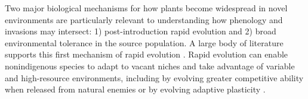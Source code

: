 \documentclass[11pt]{article}\usepackage[]{graphicx}\usepackage[]{color}
\begin{document}
Two major biological mechanisms for how plants become widespread in novel environments are particularly relevant to understanding how phenology and invasions may intersect: 1) post-introduction rapid evolution and 2) broad environmental tolerance in the source population. A large body of literature supports this first mechanism of rapid evolution \parencite[e.g.,][]{Reznick2001, Prentis2008,Colautti2015,Lee2002invasion,Clements2011}.  Rapid evolution can enable nonindigenous species to adapt to vacant niches and take advantage of variable and high-resource environments, including by evolving greater competitive ability when released from natural enemies \parencites[i.e., enemy release hypothesis]{Blossey1995,Bossdorf2005}[though this hypothesis is likely less explanatory than is often assumed][]{Colautti2004} or by evolving adaptive plasticity \parencite{Richards2006}. %
\end{document}

